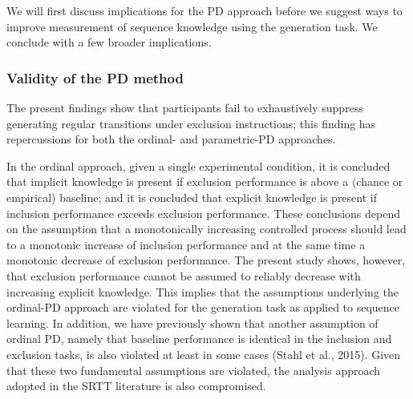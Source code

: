 \documentclass[floatsintext,doc]{apa6}
\theoremstyle{definition}
\theoremstyle{definition}
\theoremstyle{definition}
\theoremstyle{remark}
\begin{document}
We will first discuss implications for the PD approach before we suggest
ways to improve measurement of sequence knowledge using the generation
task. We conclude with a few broader implications.

\subsubsection{Validity of the PD
method}\label{validity-of-the-pd-method}

The present findings show that participants fail to exhaustively
suppress generating regular transitions under exclusion instructions;
this finding has repercussions for both the ordinal- and parametric-PD
approaches.

In the ordinal approach, given a single experimental condition, it is
concluded that implicit knowledge is present if exclusion performance is
above a (chance or empirical) baseline; and it is concluded that
explicit knowledge is present if inclusion performance exceeds exclusion
performance. These conclusions depend on the assumption that a
monotonically increasing controlled process should lead to a monotonic
increase of inclusion performance and at the same time a monotonic
decrease of exclusion performance. The present study shows, however,
that exclusion performance cannot be assumed to reliably decrease with
increasing explicit knowledge. This implies that the assumptions
underlying the ordinal-PD approach are violated for the generation task
as applied to sequence learning. In addition, we have previously shown
that another assumption of ordinal PD, namely that baseline performance
is identical in the inclusion and exclusion tasks, is also violated at
least in some cases (Stahl et al., 2015). Given that these two
fundamental assumptions are violated, the analysis approach adopted in
the SRTT literature is also compromised.
\end{document}
